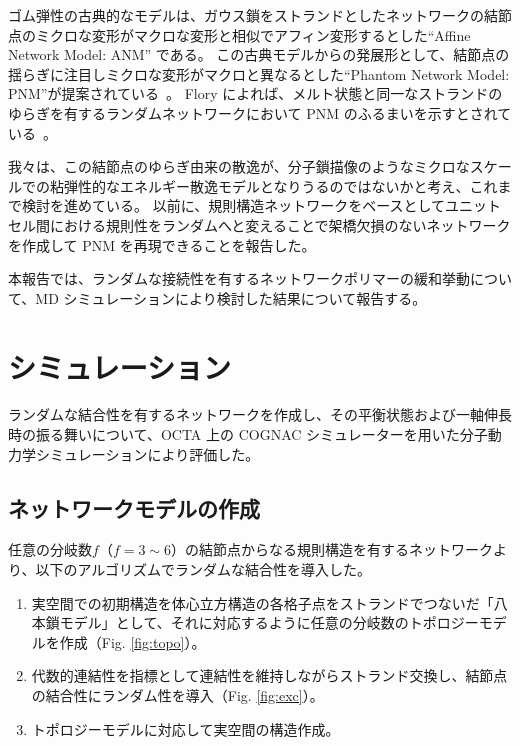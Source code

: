 \documentclass[uplatex,10pt,a4paper,twocolumn]{jsarticle}
\begin{document}
ゴム弾性の古典的なモデルは、ガウス鎖をストランドとしたネットワークの結節点のミクロな変形がマクロな変形と相似でアフィン変形するとした``Affine Network Model: ANM'' である。%
この古典モデルからの発展形として、結節点の揺らぎに注目しミクロな変形がマクロと異なるとした``Phantom Network Model: PNM''が提案されている~\cite{James1943}。
Flory によれば、メルト状態と同一なストランドのゆらぎを有するランダムネットワークにおいて PNM のふるまいを示すとされている~\cite{Flory1976}。

我々は、この結節点のゆらぎ由来の散逸が、分子鎖描像のようなミクロなスケールでの粘弾性的なエネルギー散逸モデルとなりうるのではないかと考え、これまで検討を進めている。
以前に、規則構造ネットワークをベースとしてユニットセル間における規則性をランダムへと変えることで架橋欠損のないネットワークを作成して PNM を再現できることを報告した。

本報告では、ランダムな接続性を有するネットワークポリマーの緩和挙動について、MD シミュレーションにより検討した結果について報告する。

\section{シミュレーション}
\vspace{-2mm}

ランダムな結合性を有するネットワークを作成し、その平衡状態および一軸伸長時の振る舞いについて、OCTA 上の COGNAC シミュレーターを用いた分子動力学シミュレーションにより評価した。


\subsection{ネットワークモデルの作成}

任意の分岐数$f$（$f=3\sim6$）の結節点からなる規則構造を有するネットワークより、以下のアルゴリズムでランダムな結合性を導入した。

\vspace{-2mm}
\begin{enumerate}
\item
実空間での初期構造を体心立方構造の各格子点をストランドでつないだ「八本鎖モデル」として、それに対応するように任意の分岐数のトポロジーモデルを作成（Fig. \ref{fig:topo}）。
\item
代数的連結性を指標として連結性を維持しながらストランド交換し、結節点の結合性にランダム性を導入（Fig. \ref{fig:exc}）。
\item
トポロジーモデルに対応して実空間の構造作成。
\end{enumerate}
\end{document}
